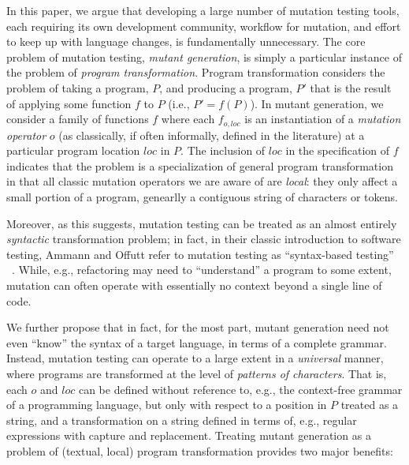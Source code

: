 \documentclass[sigconf,review, anonymous]{acmart}
\begin{document}
In this paper, we argue that developing a large number of mutation
testing tools, each requiring its own development community, workflow
for mutation, and effort to keep up with language changes, is fundamentally
unnecessary.  The core problem of mutation testing,
\emph{mutant generation}, is simply a particular instance of the
problem of \emph{program transformation}.  Program transformation
considers the problem of taking a program, $P$, and producing a
program, $P'$ that is the result of applying some function $f$ to $P$
(i.e., $P' = f(P)$).  In mutant generation, we
consider a family of functions $f$ where each $f_{o,loc}$ is an
instantiation of a \emph{mutation operator} $o$  (as classically, if
often informally, defined in the literature) at a particular program
location $loc$ in $P$.  The inclusion of $loc$ in the specification of
$f$ indicates that the problem is a specialization of general
program transformation in that all classic mutation operators we are
aware of are \emph{local}: they only affect a small portion of a
program, genearlly a contiguous string of characters or tokens.

Moreover, as this suggests,
mutation testing can be treated as an almost entirely \emph{syntactic}
transformation problem; in fact, in their classic introduction to
software testing, Ammann and Offutt refer to mutation testing as
``syntax-based testing'' ~\cite{ammann2016introduction}.  While, e.g., refactoring may need to
``understand'' a program to some extent, mutation can often operate
with essentially no context beyond a single line of code.

We further propose that in fact, for the most part, mutant
generation need not even ``know'' the syntax of a target language, in
terms of a complete grammar.  Instead, mutation testing can operate to
a large extent in a \emph{universal} manner, where programs are
transformed at the level of \emph{patterns of characters}.  That is,
each $o$ and $loc$ can be defined without reference to, e.g., the
context-free grammar of a programming language, but only with respect
to a position in $P$ treated as a string, and a transformation on a
string defined in terms of, e.g., regular expressions with capture and
replacement.  Treating mutant generation as a problem of (textual, local)
program transformation provides two major benefits:
\end{document}
